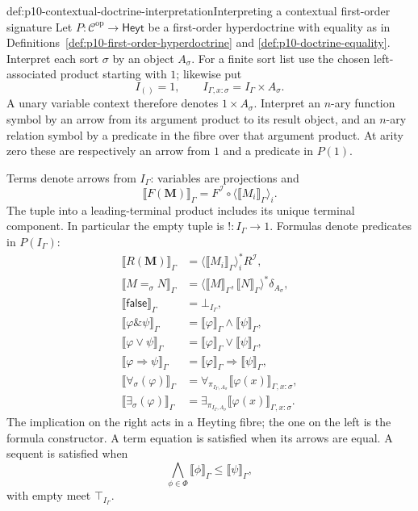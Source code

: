 \begin{hbdefinition}{def:p10-contextual-doctrine-interpretation}{Interpreting a contextual first-order signature}
Let \(P:\mathcal C^{\mathrm{op}}\to\mathsf{Heyt}\) be a first-order
hyperdoctrine with equality as in
Definitions~\ref{def:p10-first-order-hyperdoctrine} and
\ref{def:p10-doctrine-equality}.
Interpret each sort \(\sigma\) by an object \(A_\sigma\).
For a finite sort list use the chosen left-associated product starting
with \(1\); likewise put
\[
 I_{()}=1,\qquad I_{\Gamma,x:\sigma}=I_\Gamma\times A_\sigma.
\]
A unary variable context therefore denotes \(1\times A_\sigma\).
Interpret an \(n\)-ary function symbol by an arrow from its argument
product to its result object, and an \(n\)-ary relation symbol by a
predicate in the fibre over that argument product.
At arity zero these are respectively an arrow from \(1\) and a
predicate in \(P(1)\).

Terms denote arrows from \(I_\Gamma\): variables are projections and
\[
 \llbracket F(\mathbf M)\rrbracket_\Gamma
       =F^{\mathcal I}\circ\langle\llbracket M_i\rrbracket_\Gamma\rangle_i.
\]
The tuple into a leading-terminal product includes its unique terminal
component. In particular the empty tuple is \(!:I_\Gamma\to1\).
Formulas denote predicates in \(P(I_\Gamma)\):
\[
\begin{aligned}
 \llbracket R(\mathbf M)\rrbracket_\Gamma
   &=\langle\llbracket M_i\rrbracket_\Gamma\rangle_i^*R^{\mathcal I},\\
 \llbracket M=_\sigma N\rrbracket_\Gamma
   &=\langle\llbracket M\rrbracket_\Gamma,
                         \llbracket N\rrbracket_\Gamma\rangle^*\delta_{A_\sigma},\\
 \llbracket\mathsf{false}\rrbracket_\Gamma&=\bot_{I_\Gamma},\\
 \llbracket\varphi\mathbin{\&}\psi\rrbracket_\Gamma
   &=\llbracket\varphi\rrbracket_\Gamma\wedge\llbracket\psi\rrbracket_\Gamma,\\
 \llbracket\varphi\vee\psi\rrbracket_\Gamma
   &=\llbracket\varphi\rrbracket_\Gamma\vee\llbracket\psi\rrbracket_\Gamma,\\
 \llbracket\varphi\Rightarrow\psi\rrbracket_\Gamma
   &=\llbracket\varphi\rrbracket_\Gamma
                        \Rightarrow\llbracket\psi\rrbracket_\Gamma,\\
 \llbracket\forall_\sigma(\varphi)\rrbracket_\Gamma
   &=\forall_{\pi_{I_\Gamma,A_\sigma}}
                      \llbracket\varphi(x)\rrbracket_{\Gamma,x:\sigma},\\
 \llbracket\exists_\sigma(\varphi)\rrbracket_\Gamma
   &=\exists_{\pi_{I_\Gamma,A_\sigma}}
                      \llbracket\varphi(x)\rrbracket_{\Gamma,x:\sigma}.
\end{aligned}
\]
The implication on the right acts in a Heyting fibre; the one on the
left is the formula constructor.
A term equation is satisfied when its arrows are equal.
A sequent is satisfied when
\[
          \bigwedge_{\phi\in\Phi}\llbracket\phi\rrbracket_\Gamma
                                  \leq\llbracket\psi\rrbracket_\Gamma,
\]
with empty meet \(\top_{I_\Gamma}\).
\end{hbdefinition}


